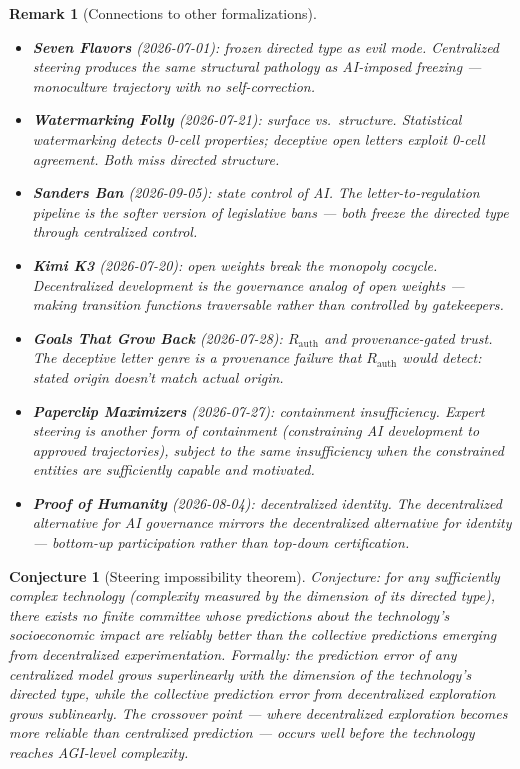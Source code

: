 \documentclass[11pt,a4paper]{article}
\newtheorem{conjecture}[definition]{Conjecture}
\newtheorem{remark}[definition]{Remark}
\begin{document}
\begin{remark}[Connections to other formalizations]
\begin{itemize}
\item \textbf{Seven Flavors} (2026-07-01): frozen directed type as
  evil mode. Centralized steering produces the same structural
  pathology as AI-imposed freezing --- monoculture trajectory with
  no self-correction.
\item \textbf{Watermarking Folly} (2026-07-21): surface vs.\ structure.
  Statistical watermarking detects 0-cell properties; deceptive open
  letters exploit 0-cell agreement. Both miss directed structure.
\item \textbf{Sanders Ban} (2026-09-05): state control of AI. The
  letter-to-regulation pipeline is the softer version of legislative
  bans --- both freeze the directed type through centralized control.
\item \textbf{Kimi K3} (2026-07-20): open weights break the monopoly
  cocycle. Decentralized development is the governance analog of
  open weights --- making transition functions traversable rather
  than controlled by gatekeepers.
\item \textbf{Goals That Grow Back} (2026-07-28): $R_{\text{auth}}$
  and provenance-gated trust. The deceptive letter genre is a
  provenance failure that $R_{\text{auth}}$ would detect: stated
  origin doesn't match actual origin.
\item \textbf{Paperclip Maximizers} (2026-07-27): containment
  insufficiency. Expert steering is another form of containment
  (constraining AI development to approved trajectories), subject
  to the same insufficiency when the constrained entities are
  sufficiently capable and motivated.
\item \textbf{Proof of Humanity} (2026-08-04): decentralized identity.
  The decentralized alternative for AI governance mirrors the
  decentralized alternative for identity --- bottom-up participation
  rather than top-down certification.
\end{itemize}
\end{remark}

\begin{conjecture}[Steering impossibility theorem]
Conjecture: for any sufficiently complex technology (complexity measured
by the dimension of its directed type), there exists no finite committee
whose predictions about the technology's socioeconomic impact are
reliably better than the collective predictions emerging from
decentralized experimentation. Formally: the prediction error of any
centralized model grows superlinearly with the dimension of the
technology's directed type, while the collective prediction error from
decentralized exploration grows sublinearly. The crossover point ---
where decentralized exploration becomes more reliable than centralized
prediction --- occurs well before the technology reaches AGI-level
complexity.
\end{conjecture}
\end{document}
